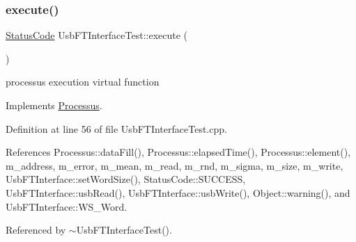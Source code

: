 \subsubsection{\texorpdfstring{execute()}{execute()}}
{\footnotesize\ttfamily \hyperlink{classStatusCode}{Status\+Code} Usb\+F\+T\+Interface\+Test\+::execute (\begin{DoxyParamCaption}{ }\end{DoxyParamCaption})\hspace{0.3cm}{\ttfamily [virtual]}}

processus execution virtual function 

Implements \hyperlink{classProcessus_a63767a63a1fb0055c5aa45b21a4a5d58}{Processus}.



Definition at line 56 of file Usb\+F\+T\+Interface\+Test.\+cpp.



References Processus\+::data\+Fill(), Processus\+::elapsed\+Time(), Processus\+::element(), m\+\_\+address, m\+\_\+error, m\+\_\+mean, m\+\_\+read, m\+\_\+rnd, m\+\_\+sigma, m\+\_\+size, m\+\_\+write, Usb\+F\+T\+Interface\+::set\+Word\+Size(), Status\+Code\+::\+S\+U\+C\+C\+E\+SS, Usb\+F\+T\+Interface\+::usb\+Read(), Usb\+F\+T\+Interface\+::usb\+Write(), Object\+::warning(), and Usb\+F\+T\+Interface\+::\+W\+S\+\_\+\+Word.



Referenced by $\sim$\+Usb\+F\+T\+Interface\+Test().


